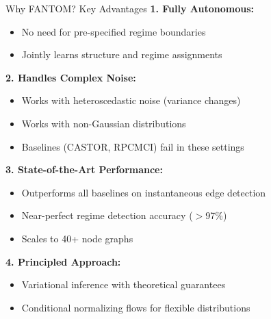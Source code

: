 \documentclass[aspectratio=169]{beamer}
\begin{document}
\begin{frame}{Why FANTOM? Key Advantages}
\textbf{1. Fully Autonomous:}
\begin{itemize}
    \item No need for pre-specified regime boundaries
    \item Jointly learns structure and regime assignments
\end{itemize}

\vspace{0.2cm}
\textbf{2. Handles Complex Noise:}
\begin{itemize}
    \item Works with heteroscedastic noise (variance changes)
    \item Works with non-Gaussian distributions
    \item Baselines (CASTOR, RPCMCI) fail in these settings
\end{itemize}

\vspace{0.2cm}
\textbf{3. State-of-the-Art Performance:}
\begin{itemize}
    \item Outperforms all baselines on instantaneous edge detection
    \item Near-perfect regime detection accuracy ($>$97\%)
    \item Scales to 40+ node graphs
\end{itemize}

\vspace{0.2cm}
\textbf{4. Principled Approach:}
\begin{itemize}
    \item Variational inference with theoretical guarantees
    \item Conditional normalizing flows for flexible distributions
\end{itemize}
\end{frame}
\end{document}
